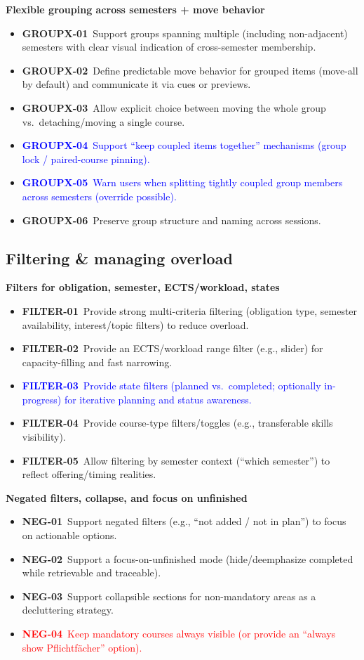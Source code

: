 \textbf{Flexible grouping across semesters + move behavior}
\begin{itemize}
  \item \textbf{GROUPX-01}~Support groups spanning multiple (including non-adjacent) semesters with clear visual indication of cross-semester membership.
  \item \textbf{GROUPX-02}~Define predictable move behavior for grouped items (move-all by default) and communicate it via cues or previews.
  \item \textbf{GROUPX-03}~Allow explicit choice between moving the whole group vs.\ detaching/moving a single course.
  \item \textcolor{blue}{\textbf{GROUPX-04}~Support “keep coupled items together” mechanisms (group lock / paired-course pinning).}
  \item \textcolor{blue}{\textbf{GROUPX-05}~Warn users when splitting tightly coupled group members across semesters (override possible).}
  \item \textbf{GROUPX-06}~Preserve group structure and naming across sessions.
\end{itemize}


\subsection*{Filtering \& managing overload}

\textbf{Filters for obligation, semester, ECTS/workload, states}
\begin{itemize}
  \item \textbf{FILTER-01}~Provide strong multi-criteria filtering (obligation type, semester availability, interest/topic filters) to reduce overload.
  \item \textbf{FILTER-02}~Provide an ECTS/workload range filter (e.g., slider) for capacity-filling and fast narrowing.
  \item \textcolor{blue}{\textbf{FILTER-03}~Provide state filters (planned vs.\ completed; optionally in-progress) for iterative planning and status awareness.}
  \item \textbf{FILTER-04}~Provide course-type filters/toggles (e.g., transferable skills visibility).
  \item \textbf{FILTER-05}~Allow filtering by semester context (“which semester”) to reflect offering/timing realities.
\end{itemize}

\textbf{Negated filters, collapse, and focus on unfinished}
\begin{itemize}
  \item \textbf{NEG-01}~Support negated filters (e.g., “not added / not in plan”) to focus on actionable options.
  \item \textbf{NEG-02}~Support a focus-on-unfinished mode (hide/deemphasize completed while retrievable and traceable).
  \item \textbf{NEG-03}~Support collapsible sections for non-mandatory areas as a decluttering strategy.
  \item \textcolor{red}{\textbf{NEG-04}~Keep mandatory courses always visible (or provide an “always show Pflichtf\"acher” option).}
\end{itemize}

